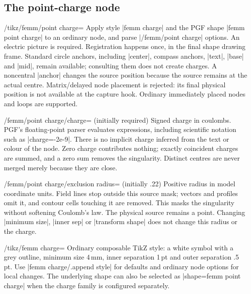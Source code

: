 \subsection{The point-charge node}
\label{sec:electric-charge}
\begin{key}{/tikz/femm/point charge=}
Apply style |femm charge| and the PGF shape |femm point charge| to an ordinary
node, and parse |/femm/point charge| options. An electric picture is required.
Registration happens once, in the final shape drawing frame. Standard circle
anchors, including |center|, compass anchors, |text|, |base| and |mid|, remain
available; consulting them does not create charges. A noncentral |anchor|
changes the source position because the source remains at the actual centre.
Matrix/delayed node placement is rejected: its final physical position is not
available at the capture hook. Ordinary immediately placed nodes and loops are
supported.
\end{key}

\begin{key}{/femm/point charge/charge= (initially \normalfont required)}
Signed charge in coulombs. PGF's floating-point parser evaluates expressions,
including scientific notation such as |charge=-2e-9|. There is no implicit
charge inferred from the text or colour of the node. Zero charge contributes
nothing; exactly coincident charges are summed, and a zero sum removes the
singularity. Distinct centres are never merged merely because they are close.
\end{key}

\begin{key}{/femm/point charge/exclusion radius= (initially .22)}
Positive radius in model coordinate units. Field lines stop outside this
source mask; vectors and profiles omit it, and contour cells touching it are
removed. This masks the singularity without softening Coulomb's law. The
physical source remains a point. Changing |minimum size|, |inner sep| or
|transform shape| does not change this radius or the charge.
\end{key}

\begin{key}{/tikz/femm charge=}
Ordinary composable TikZ style: a white symbol with a grey outline, minimum
size 4\,mm, inner separation 1\,pt and outer separation .5\,pt. Use
|femm charge/.append style| for defaults and ordinary node options for local
changes. The underlying shape can also be selected as |shape=femm point charge|
when the charge family is configured separately.
\end{key}


